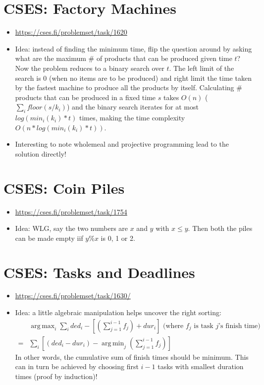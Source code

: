 \documentclass[titlepage, 12pt]{book}
\DeclareMathOperator*{\argmax}{arg\,max}
\DeclareMathOperator*{\argmin}{arg\,min}
\begin{document}
\section{CSES: Factory Machines}
\begin{itemize}
    \item \url{https://cses.fi/problemset/task/1620}
    \item Idea: instead of finding the minimum time, flip the question around by
        asking what are the maximum \# of products that can be produced given
        time $t$? Now the problem reduces to a binary search over $t$. The left
        limit of the search is 0 (when no items are to be produced) and right
        limit the time taken by the fastest machine to produce all the products
        by itself. Calculating \# products that can be produced in a fixed time
        $s$ takes $O(n)$ ($\sum_i floor(s/k_i)$) and the binary search iterates
        for at most $log(min_i(k_i) * t)$ times, making the time complexity
        $O(n * log(min_i(k_i) * t))$.
    \item Interesting to note wholemeal and projective programming lead to the
        solution directly!
\end{itemize}

\section{CSES: Coin Piles}
\begin{itemize}
    \item \url{https://cses.fi/problemset/task/1754}
    \item Idea: WLG, say the two numbers are $x$ and $y$ with $x \leq y$. Then both
        the piles can be made empty iif $y\%x$ is 0, 1 or 2.
\end{itemize}

\section{CSES: Tasks and Deadlines}
\begin{itemize}
    \item \url{https://cses.fi/problemset/task/1630/}
    \item Idea: a little algebraic manipulation helps uncover the right sorting:
        \begin{align*}
            &\argmax_{i}\sum_i ded_i - [(\sum_{j = 1}^{i - 1}f_j) + dur_i]
            \textrm{ (where $f_j$ is task $j$'s finish time)}\\
            = &\sum_{i} [(ded_i - dur_i) - \argmin_{j}(\sum_{j = 1}^{i - 1}f_j)]
        \end{align*}
        In other words, the cumulative sum of finish times should be minimum.
        This can in turn be achieved by choosing first $i - 1$ tasks with
        smallest duration times (proof by induction)!
\end{itemize}
\end{document}
